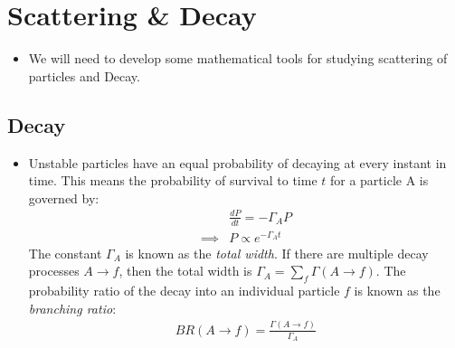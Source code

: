 \documentclass[11pt]{article}
\numberwithin{equation}{section}
\begin{document}
\newpage
\section{Scattering \& Decay} %
\label{sec:scattering}
\begin{itemize}
    \item We will need to develop some mathematical tools for studying scattering of particles and Decay.
\end{itemize}

\subsection{Decay} %
 \label{sub:decay}
 \begin{itemize}
     \item Unstable particles have an equal probability of decaying at every instant in time. This means the probability of survival to time $t$ for a particle A is governed by:
     \begin{align*}
         &\frac{dP}{dt} = -\Gamma_A P \\
         \implies & P \propto e^{-\Gamma_At}
     \end{align*}
     The constant $\Gamma_A$ is known as the \emph{total width}. If there are multiple decay processes $A \rightarrow f$, then the total width is $\Gamma_A = \sum_f\Gamma(A \rightarrow f)$. The probability ratio of the decay into an individual particle $f$ is known as the \emph{branching ratio}: 
     \begin{align*}
         BR(A \rightarrow f) = \frac{\Gamma(A\rightarrow f)}{\Gamma_A} 
     \end{align*}
 \end{itemize}
\end{document}
